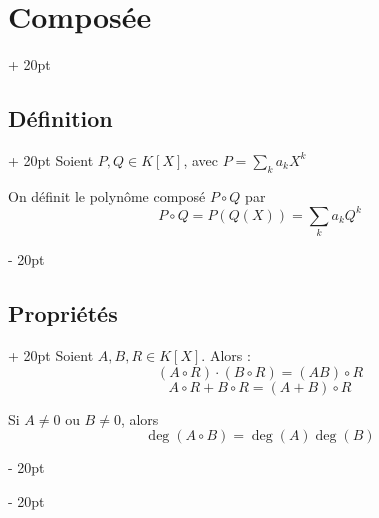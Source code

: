 \documentclass[a4paper, 12pt, twoside]{article}
\newcommand{\ind}[1][20pt]{\advance\leftskip + #1}
\newcommand{\deind}[1][20pt]{\advance\leftskip - #1}
\newenvironment{indt}[2][20pt]{#2 \par \ind[#1]}{\par \deind} %
\begin{document}
    \begin{indt}{\section{Composée}}
        
        \begin{indt}{\subsection{Définition}}
            Soient $P, Q \in K[X]$, avec $\displaystyle P = \sum_k a_k X^k$
            
            On définit le polynôme composé $P \circ Q$ par
                \[ P \circ Q = P(Q(X)) = \sum_k a_k Q^k \]
        \end{indt}
        
        \vspace{6pt}
        
        \begin{indt}{\subsection{Propriétés}}
            Soient $A, B, R \in K[X]$. Alors :
                \[ (A \circ R) \cdot (B \circ R) = (AB) \circ R \]
                \[ A \circ R + B \circ R = (A + B) \circ R \]
            
            \vspace{6pt}
            
            Si $A \neq 0$ ou $B \neq 0$, alors
                \[ \deg(A \circ B) = \deg(A) \deg(B) \]
        \end{indt}
        
    \end{indt}
    
    \vspace{12pt}
    
\end{document}
